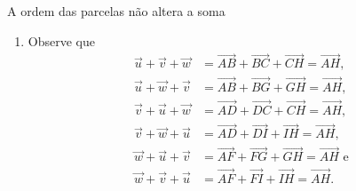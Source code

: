 \begin{answer}{A ordem das parcelas não altera a soma}
{
\begin{enumerate}
\item Observe que 
\begin{align*}
\vec{u} + \vec{v} + \vec{w} &= \overrightarrow{AB} + \overrightarrow{BC} + \overrightarrow{CH} = \overrightarrow{AH},\\ 
\vec{u} + \vec{w} + \vec{v} &= \overrightarrow{AB} + \overrightarrow{BG} + \overrightarrow{GH} = \overrightarrow{AH},\\
\vec{v} + \vec{u} + \vec{w} &= \overrightarrow{AD} + \overrightarrow{DC} + \overrightarrow{CH} = \overrightarrow{AH}, \\
\vec{v} + \vec{w} + \vec{u} &= \overrightarrow{AD} + \overrightarrow{DI} + \overrightarrow{IH} = \overrightarrow{AH}, \\
\vec{w} + \vec{u} + \vec{v} &= \overrightarrow{AF} + \overrightarrow{FG} + \overrightarrow{GH} = \overrightarrow{AH}\text{ e}\\
\vec{w} + \vec{v} + \vec{u} &= \overrightarrow{AF} + \overrightarrow{FI} + \overrightarrow{IH} = \overrightarrow{AH}.
\end{align*}

\begin{figure}[H]
\centering


\end{figure}
\end{enumerate}}
\end{answer}
